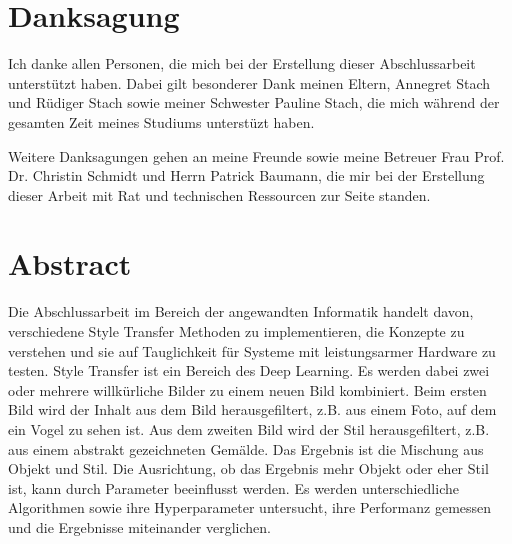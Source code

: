 \chapter*{Danksagung}

Ich danke allen Personen, die mich bei der Erstellung dieser Abschlussarbeit unterstützt haben. Dabei gilt besonderer Dank meinen Eltern, Annegret Stach und Rüdiger Stach sowie meiner Schwester Pauline Stach, die mich während der gesamten Zeit meines Studiums unterstüzt haben.

Weitere Danksagungen gehen an meine Freunde sowie meine Betreuer Frau Prof. Dr. Christin Schmidt und Herrn Patrick Baumann, die mir bei der Erstellung dieser Arbeit mit Rat und technischen Ressourcen zur Seite standen.

\pagebreak

\chapter*{Abstract}

Die Abschlussarbeit im Bereich der angewandten Informatik handelt davon, verschiedene Style Transfer Methoden zu implementieren, die Konzepte zu verstehen und sie auf Tauglichkeit für Systeme mit leistungsarmer Hardware zu testen. Style Transfer ist ein Bereich des Deep Learning. Es werden dabei zwei oder mehrere willkürliche Bilder zu einem neuen Bild kombiniert. Beim ersten Bild wird der Inhalt aus dem Bild herausgefiltert, z.B. aus einem Foto, auf dem ein Vogel zu sehen ist. Aus dem zweiten Bild wird der Stil herausgefiltert, z.B. aus einem abstrakt gezeichneten Gemälde. Das Ergebnis ist die Mischung aus Objekt und Stil. Die Ausrichtung, ob das Ergebnis mehr Objekt oder eher Stil ist, kann durch Parameter beeinflusst werden. Es werden unterschiedliche Algorithmen sowie ihre Hyperparameter untersucht, ihre Performanz gemessen und die Ergebnisse miteinander verglichen.